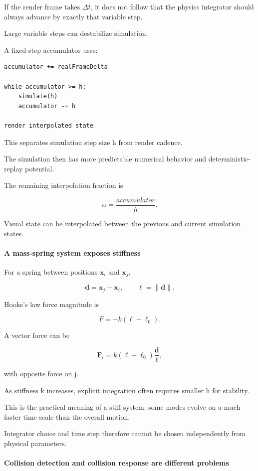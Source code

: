 If the render frame takes \(\Delta t\), it does not follow that the physics integrator should always advance by exactly that variable step.

Large variable steps can destabilize simulation.

A fixed-step accumulator uses:

\begin{verbatim}
accumulator += realFrameDelta

while accumulator >= h:
    simulate(h)
    accumulator -= h

render interpolated state
\end{verbatim}

This separates simulation step size h from render cadence.

The simulation then has more predictable numerical behavior and deterministic-replay potential.

The remaining interpolation fraction is

\[
\alpha=
\frac{accumulator}{h}.
\]

Visual state can be interpolated between the previous and current simulation states.

\paragraph{A mass-spring system exposes stiffness}\label{a-mass-spring-system-exposes-stiffness}

For a spring between positions \(\mathbf x_i\) and \(\mathbf x_j\),

\[
\mathbf d=\mathbf x_j-\mathbf x_i,
\qquad
\ell=\|\mathbf d\|.
\]

Hooke's law force magnitude is

\[
F=-k(\ell-\ell_0).
\]

A vector force can be

\[
\mathbf F_i
=
k(\ell-\ell_0)
\frac{\mathbf d}{\ell},
\]

with opposite force on j.

As stiffness k increases, explicit integration often requires smaller h for stability.

This is the practical meaning of a stiff system: some modes evolve on a much faster time scale than the overall motion.

Integrator choice and time step therefore cannot be chosen independently from physical parameters.

\paragraph{Collision detection and collision response are different problems}\label{collision-detection-and-collision-response-are-different-problems}

